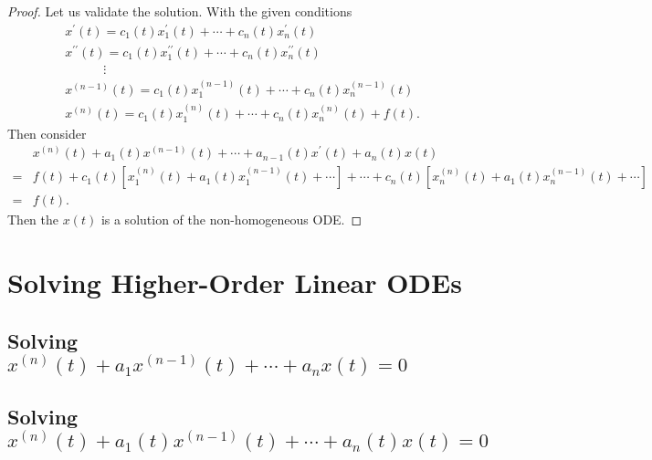 \begin{proof}
  Let us validate the solution. With the given conditions
  \begin{align}
    & x^{\prime}(t) = c_1(t)x^{\prime}_1(t) + \cdots + c_n(t)x^{\prime}_n(t)\\
    & x^{\prime\prime}(t) = c_1(t)x^{\prime\prime}_1(t) + \cdots + c_n(t)x_n^{\prime\prime}(t)\\
    & \quad \quad \quad \vdots\\
    & x^{(n-1)}(t) = c_1(t)x_1^{(n-1)}(t) + \cdots + c_n(t) x_n^{(n-1)}(t)\\
    & x^{(n)}(t) = c_1(t)x_1^{(n)}(t) + \cdots + c_n(t) x_n^{(n)}(t) + f(t).
  \end{align}
  Then consider
  \begin{align}
    &x^{(n)}(t) + a_1(t)x^{(n-1)}(t) + \cdots + a_{n-1}(t)x^{\prime}(t) + a_n(t)x(t)\\
    =& f(t) + c_1(t)[x_1^{(n)}(t) + a_1(t) x_1^{(n-1)}(t) + \cdots] + \cdots + c_n(t)[x_n^{(n)}(t) + a_1(t)x_n^{(n-1)}(t) + \cdots]\\
    =& f(t).
  \end{align}
  Then the $x(t)$ is a solution of the non-homogeneous ODE.
\end{proof}

\section{Solving Higher-Order Linear ODEs}

\subsection{Solving $x^{(n)}(t) + a_1x^{(n-1)}(t) + \cdots + a_nx(t) = 0$}




\subsection{Solving $x^{(n)}(t) + a_1(t)x^{(n-1)}(t) + \cdots + a_n(t)x(t) = 0$}




